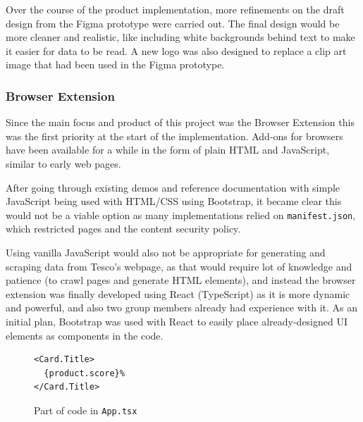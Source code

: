 \documentclass[a4,10pt,twocolumn]{article}
\begin{document}
\par Over the course of the product implementation, more refinements on the draft design from the Figma prototype were carried out. The final design would be more cleaner and realistic, like including white backgrounds behind text to make it easier for data to be read. A new logo was also designed to replace a clip art image that had been used in the Figma prototype.

\subsubsection*{Browser Extension}

Since the main focus and product of this project was the Browser Extension this was the first priority at the start of the implementation. Add-ons for browsers have been available for a while in the form of plain HTML and JavaScript, similar to early web pages. %

After going through existing demos and reference documentation with simple JavaScript being used with HTML/CSS using Bootstrap, it became clear this would not be a viable option as many implementations relied on \texttt{manifest.json}, which restricted pages and the content security policy.

Using vanilla JavaScript would also not be appropriate for generating and scraping data from Tesco's webpage, as that would require lot of knowledge and patience (to crawl pages and generate HTML elements), and instead the browser extension was finally developed using React (TypeScript) \cite{React} as it is more dynamic and powerful, and also two group members already had experience with it. As an initial plan, Bootstrap was used with React \cite{ReactBootstrap} to easily place already-designed UI elements as components in the code.

\begin{figure}[h]
\centering
\begin{verbatim}
<Card.Title>
  {product.score}%
</Card.Title>
\end{verbatim}
\caption{Part of code in \texttt{App.tsx}}
\end{figure}
\end{document}
